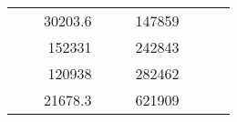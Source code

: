 \begin{table}[H]
\begin{tabular}{|ccrccrccc}
\multicolumn{1}{|c|}{\cellcolor[HTML]{FFFFC7}}                                & \multicolumn{1}{c|}{\cellcolor[HTML]{DDFDFF}}                      & \multicolumn{1}{r|}{\cellcolor[HTML]{DAE8FC}30203.6}   & \multicolumn{1}{c|}{\cellcolor[HTML]{FFFFC7}}                                & \multicolumn{1}{c|}{\cellcolor[HTML]{DDFDFF}}                       & \multicolumn{1}{r|}{\cellcolor[HTML]{DDFDFF}147859}    &                                                                              &                                                                    &                                                        \\ \cline{3-3} \cline{6-6}
\multicolumn{1}{|c|}{\cellcolor[HTML]{FFFFC7}}                                & \multicolumn{1}{c|}{\cellcolor[HTML]{DDFDFF}}                      & \multicolumn{1}{r|}{\cellcolor[HTML]{DDFDFF}152331}    & \multicolumn{1}{c|}{\cellcolor[HTML]{FFFFC7}}                                & \multicolumn{1}{c|}{\cellcolor[HTML]{DDFDFF}}                       & \multicolumn{1}{r|}{\cellcolor[HTML]{DAE8FC}242843}    &                                                                              &                                                                    &                                                        \\ \cline{3-3} \cline{6-6}
\multicolumn{1}{|c|}{\cellcolor[HTML]{FFFFC7}}                                & \multicolumn{1}{c|}{\cellcolor[HTML]{DDFDFF}}                      & \multicolumn{1}{r|}{\cellcolor[HTML]{DAE8FC}120938}    & \multicolumn{1}{c|}{\cellcolor[HTML]{FFFFC7}}                                & \multicolumn{1}{c|}{\cellcolor[HTML]{DDFDFF}}                       & \multicolumn{1}{r|}{\cellcolor[HTML]{DDFDFF}282462}    &                                                                              &                                                                    &                                                        \\ \cline{3-3} \cline{6-6}
\multicolumn{1}{|c|}{\cellcolor[HTML]{FFFFC7}}                                & \multicolumn{1}{c|}{\cellcolor[HTML]{DDFDFF}}                      & \multicolumn{1}{r|}{\cellcolor[HTML]{DDFDFF}21678.3}   & \multicolumn{1}{c|}{\cellcolor[HTML]{FFFFC7}}                                & \multicolumn{1}{c|}{\cellcolor[HTML]{DDFDFF}}                       & \multicolumn{1}{r|}{\cellcolor[HTML]{DAE8FC}621909}    &                                                                              &                                                                    &                                                        \\ \cline{3-3} \cline{6-6}

\end{tabular}
\end{table}
